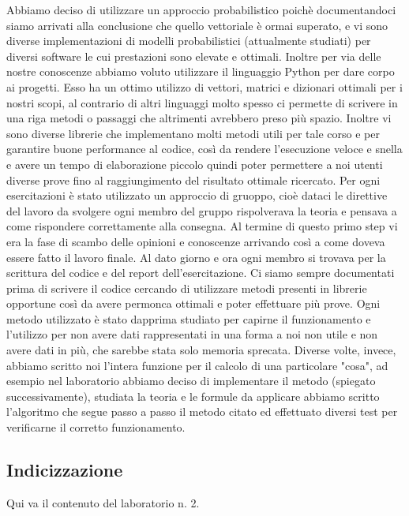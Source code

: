 \documentclass{llncs}
\begin{document}
Abbiamo deciso di utilizzare un approccio probabilistico poichè documentandoci siamo arrivati alla conclusione che quello vettoriale è ormai superato, e vi sono diverse implementazioni di modelli probabilistici (attualmente studiati) per diversi software le cui prestazioni sono elevate e ottimali.
Inoltre per via delle nostre conoscenze abbiamo voluto utilizzare il linguaggio Python per dare corpo ai progetti. Esso ha un ottimo utilizzo di vettori, matrici e dizionari ottimali per i nostri scopi, al contrario di altri linguaggi molto spesso ci permette di scrivere in una riga metodi o passaggi che altrimenti avrebbero preso più spazio. Inoltre vi sono diverse librerie che implementano molti metodi utili per tale corso e per garantire buone performance al codice, così da rendere l'esecuzione veloce e snella e avere un tempo di elaborazione piccolo quindi poter permettere a noi utenti diverse prove fino al raggiungimento del risultato ottimale ricercato.
Per ogni esercitazioni è stato utilizzato un approccio di gruoppo, cioè dataci le direttive del lavoro da svolgere ogni membro del gruppo rispolverava la teoria e pensava a come rispondere correttamente alla consegna. Al termine di questo primo step vi era la fase di scambo delle opinioni e conoscenze arrivando così a come doveva essere fatto il lavoro finale. Al dato giorno e ora ogni membro si trovava per la scrittura del codice e del report dell'esercitazione.
Ci siamo sempre documentati prima di scrivere il codice cercando di utilizzare metodi presenti in librerie opportune così da avere permonca ottimali e poter effettuare più prove. Ogni metodo utilizzato è stato dapprima studiato per capirne il funzionamento e l'utilizzo per non avere dati rappresentati in una forma a noi non utile e non avere dati in più, che sarebbe stata solo memoria sprecata. 
Diverse volte, invece, abbiamo scritto noi l'intera funzione per il calcolo di una particolare "cosa", ad esempio nel laboratorio  abbiamo deciso di implementare il metodo  (spiegato successivamente), studiata la teoria e le formule da applicare abbiamo scritto l'algoritmo che segue passo a passo il metodo citato ed effettuato diversi test per verificarne il corretto funzionamento.

\subsection{Indicizzazione} \label{sec:metodi-di-indic}

Qui va il contenuto del laboratorio n. 2.
\end{document}
